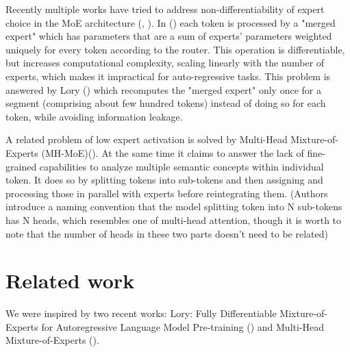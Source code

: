 \documentclass[12pt]{article}
\begin{document}

Recently multiple works have tried to address non-differentiability of expert choice in the MoE architecture (\cite{Puigcerver2023FromST}, \cite{muqeeth2023soft}). In (\cite{muqeeth2023soft}) each token is processed  by a "merged expert" which has parameters that are a sum of experts' parameters weighted uniquely for every token according to the router. This operation is differentiable, but increases computational complexity, scaling linearly with the number of experts, which makes it impractical for auto-regressive tasks. This problem is answered by Lory (\cite{zhong2024lory}) which recomputes the "merged expert" only once for a segment (comprising about few hundred tokens) instead of doing so for each token, while avoiding information leakage.

A related problem of low expert activation is solved by Multi-Head Mixture-of-Experts (MH-MoE)(\cite{wu2024multihead}). At the same time it claims to answer the lack of fine-grained capabilities to analyze multiple semantic concepts within individual token. 
It does so by splitting tokens into sub-tokens and then assigning and processing those in parallel with experts before reintegrating them. 
 (Authors introduce a naming convention that the model splitting token into N sub-tokens has N heads, which resembles one of multi-head attention, though it is worth to note that the number of heads in these two parts doesn't need to be related)

 
\section{Related work}

 We were inspired by two recent works: Lory: Fully Differentiable Mixture-of-Experts for Autoregressive Language Model Pre-training (\cite{zhong2024lory}) and Multi-Head Mixture-of-Experts (\cite{wu2024multihead}).
\end{document}
